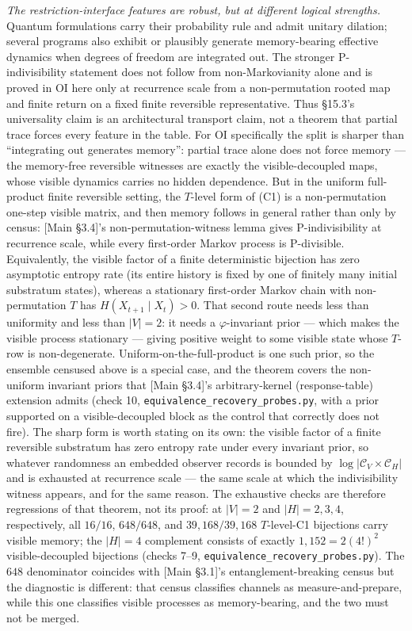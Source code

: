 \documentclass[
]{article}
\begin{document}
\emph{The restriction-interface features are robust, but at different
logical strengths.} Quantum formulations carry their probability rule
and admit unitary dilation; several programs also exhibit or plausibly
generate memory-bearing effective dynamics when degrees of freedom are
integrated out. The stronger P-indivisibility statement does not follow
from non-Markovianity alone and is proved in OI here only at recurrence
scale from a non-permutation rooted map and finite return on a fixed
finite reversible representative. Thus §15.3's universality claim is an
architectural transport claim, not a theorem that partial trace forces
every feature in the table. For OI specifically the split is sharper
than ``integrating out generates memory'': partial trace alone does not
force memory --- the memory-free reversible witnesses are exactly the
visible-decoupled maps, whose visible dynamics carries no hidden
dependence. But in the uniform full-product finite reversible setting,
the \(T\)-level form of (C1) is a non-permutation one-step visible
matrix, and then memory follows in general rather than only by census:
{[}Main §3.4{]}'s non-permutation-witness lemma gives P-indivisibility
at recurrence scale, while every first-order Markov process is
P-divisible. Equivalently, the visible factor of a finite deterministic
bijection has zero asymptotic entropy rate (its entire history is fixed
by one of finitely many initial substratum states), whereas a stationary
first-order Markov chain with non-permutation \(T\) has
\(H(X_{t+1}\mid X_t)>0\). That second route needs less than uniformity
and less than \(|V|=2\): it needs a \(\varphi\)-invariant prior ---
which makes the visible process stationary --- giving positive weight to
some visible state whose \(T\)-row is non-degenerate.
Uniform-on-the-full-product is one such prior, so the ensemble censused
above is a special case, and the theorem covers the non-uniform
invariant priors that {[}Main §3.4{]}'s arbitrary-kernel
(response-table) extension admits (check 10,
\texttt{equivalence\_recovery\_probes.py}, with a prior supported on a
visible-decoupled block as the control that correctly does not fire).
The sharp form is worth stating on its own: the visible factor of a
finite reversible substratum has zero entropy rate under every invariant
prior, so whatever randomness an embedded observer records is bounded by
\(\log|\mathcal{C}_V \times \mathcal{C}_H|\) and is exhausted at
recurrence scale --- the same scale at which the indivisibility witness
appears, and for the same reason. The exhaustive checks are therefore
regressions of that theorem, not its proof: at \(|V|=2\) and
\(|H|=2,3,4\), respectively, all \(16/16\), \(648/648\), and
\(39{,}168/39{,}168\) \(T\)-level-C1 bijections carry visible memory;
the \(|H|=4\) complement consists of exactly \(1{,}152=2(4!)^2\)
visible-decoupled bijections (checks 7--9,
\texttt{equivalence\_recovery\_probes.py}). The \(648\) denominator
coincides with {[}Main §3.1{]}'s entanglement-breaking census but the
diagnostic is different: that census classifies channels as
measure-and-prepare, while this one classifies visible processes as
memory-bearing, and the two must not be merged.
\end{document}

